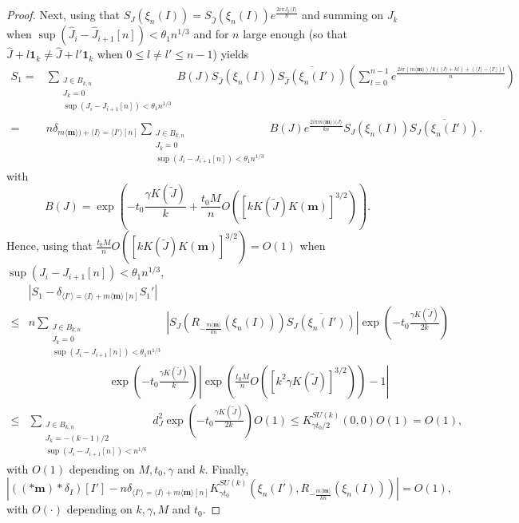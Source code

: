 \documentclass[10pt,11pt]{amsart}%
\begin{document}
\begin{proof}
Next, using that $S_{J}(\xi_{n}(I))=S_{\hat{J}}(\xi_{n}(I))e^{\frac{2i\pi J_k\langle I\rangle}{n}}$ and summing on $J_k$ when $\sup(\hat{J}_{i}-\hat{J}_{i+1} [n])<\theta_1 n^{1/3}$ and for $n$ large enough (so that $\hat{J}+l\mathbf{1}_k\not=\hat{J}+l'\mathbf{1}_k$ when $0\leq l\not=l'\leq n-1$) yields
\begin{align*}
S_1=&\sum_{\substack{J\in B_{k,n}\\J_k=0\\ \sup(J_{i}-J_{i+1} [n])< \theta_1n^{1/3}}}B(J)S_{\hat{J}}(\xi_{n}(I))\overline{S_{\hat{J}}(\xi_{n}(I'))}\left(\sum_{l=0}^{n-1}e^{\frac{2i \pi (m\langle\mathbf{m}\rangle)/k(\langle J\rangle+kl)+(\langle I\rangle-\langle I'\rangle)l}{n}}\right)\\ 
=&n\delta_{m\langle\mathbf{m}\rangle)+\langle I\rangle=\langle I'\rangle[n]}\sum_{\substack{J\in B_{k,n}\\J_k=0\\ \sup(J_{i}-J_{i+1} [n])< \theta_1 n^{1/3}}}B(J)e^{\frac{2i \pi m\langle\mathbf{m}\rangle)\langle J\rangle}{kn}}S_{J}(\xi_{n}(I))\overline{S_{J}(\xi_{n}(I'))}.
\end{align*}
with
$$B(J)=\exp\left(-t_0\frac{\gamma K(\tilde{J})}{k}+\frac{t_0M}{n}O\left(\left[kK(\tilde{J})K(\mathbf{m})\right]^{3/2}\right)\right).$$
Hence, using that $\frac{t_0M}{n}O\left(\left[kK(\tilde{J})K(\mathbf{m})\right]^{3/2}\right)=O(1)$ when $\sup(J_{i}-J_{i+1} [n])< \theta_1 n^{1/3}$,
\begin{align*}
&\left\vert S_1-\delta_{\langle I'\rangle=\langle I\rangle+m\langle \mathbf{m}\rangle[n]}S_1'\right\vert\\
\leq& n \sum_{\substack{J\in B_{k,n}\\J_k=0\\ \sup(J_{i}-J_{i+1} [n])< \theta_1n^{1/3}}}\left\vert S_{J}\left(R_{-\frac{m\langle\mathbf{m}\rangle}{kn}}\left(\xi_{n}\left(I\right)\right)\right)\overline{S_{J}(\xi_{n}(I'))}\right\vert \exp\left(-t_0\frac{\gamma K(\tilde{J})}{2k}\right)\\
&\hspace{3cm}\exp\left(-t_0\frac{\gamma K(\tilde{J})}{k}\right)\left\vert \exp\left(\frac{t_0M}{n}O\left(\left[k^2\gamma K(\tilde{J})\right]^{3/2}\right)\right)-1\right\vert\\
\leq &\sum_{\substack{J\in B_{k,n}\\J_k=-(k-1)/2\\ \sup(J_{i}-J_{i+1} [n])< n^{1/6}}}d_J^2\exp\left(-t_0\frac{\gamma K(\tilde{J})}{2k}\right)O(1)\leq K^{SU(k)}_{\gamma t_0/2}(0,0)O(1)= O\left(1\right),
\end{align*}
with $O(1)$ depending on $M,t_0,\gamma$ and $k$. Finally, 
$$\left\vert \left(\left(\ast \mathbf{m}\right)\ast \delta_I\right)[I']- n\delta_{\langle I'\rangle=\langle I\rangle+m\langle\mathbf{m}\rangle[n]}K^{SU(k)}_{\gamma t_0}\left(\xi_{n}(I'),R_{-\frac{m\langle\mathbf{m}\rangle}{kn}}\left(\xi_{n}\left(I\right)\right)\right)\right\vert=O(1),$$
with $O(\cdot)$ depending on $k, \gamma, M$ and $t_0$.
\end{proof}
\end{document}

